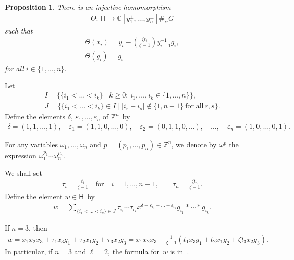\documentclass[pdftex]{sigma}
\numberwithin{equation}{section}
\newtheorem{Proposition}[Theorem]{Proposition}
{\theoremstyle{definition}
\newtheorem{Definition}[Theorem]{Definition}
\newtheorem{Example}[Theorem]{Example}
\newtheorem{Remark}[Theorem]{Remark}
\newtheorem{Notation}[Theorem]{Notation}
}
\begin{document}
\begin{Proposition}
\label{T1}
There is an injective homomorphism
\begin{gather*}
\Theta: \ \mathsf{H} \longrightarrow {\mathbb{C}}[y_1^\pm, \ldots, y_n^\pm]\#_\alpha G
\end{gather*}
such that
\begin{gather}
\Theta(x_i) = y_i - \left(\frac{\zeta t_i}{\zeta-1} \right) y_{i+1}^{-1}g_i,
\label{theta1}
\\
\Theta(g_i) = g_i
\label{theta3}
\end{gather}
for all $i\in\{1,\ldots, n\}$.
\end{Proposition}

Let
\begin{gather*}
I = \{\{i_1<\dots<i_k\} \mid k\ge 0; \ i_1,\ldots, i_k\in \{1,\dots,n\} \},
\\
J = \{\{i_1<\dots<i_k\}\in I \mid |i_r-i_s|\notin\{1,n-1\}\ \text{for all}\ r, s \}.
\end{gather*}
Def\/ine the elements $\delta$, $\varepsilon_1, \ldots, \varepsilon_n$ of ${\mathbb{Z}}^n$~by
\begin{gather*}
\delta = (1,1,\dots,1),
\quad
\varepsilon_1 = (1,1,0,\dots,0),
\quad
\varepsilon_2 = (0,1,1,0,\dots),
\quad
\ldots,
\quad
\varepsilon_n = (1,0,\dots,0,1).
\end{gather*}

\begin{Notation}
For any variables $\omega_1, \ldots, \omega_n$ and $p=(p_1,\ldots,p_n)\in {\mathbb{Z}}^n$, we denote by $\omega^p$ the
expression $\omega_1^{p_1} \cdots \omega_n^{p_n}$.
\end{Notation}

We shall set
\begin{gather*}
\tau_i = \frac{t_i}{\zeta-1}
\quad
\text{for}
\quad
i=1,\ldots, n-1,
\qquad
\tau_n = \frac{\zeta t_n}{\zeta-1}.
\end{gather*}
Def\/ine the element $w \in \mathsf{H}$~by
\begin{gather*}
w = \sum\limits_{\{i_1<\dots<i_k\}\in J} \tau_{i_1}\cdots \tau_{i_k} x^{\delta-\varepsilon_{i_1} - \dots -
\varepsilon_{i_k}} g_{i_1}*\cdots * g_{i_k}.
\end{gather*}

\begin{Example}
If $n=3$, then
\begin{gather*}
w = x_1x_2x_3 +\tau_1 x_3 g_1 + \tau_2 x_1 g_2 + \tau_3 x_2 g_3
= x_1 x_2 x_3 +\frac{1}{\zeta-1} \left(t_1 x_3 g_1 + t_2 x_1 g_2 + \zeta t_3 x_2 g_3 \right).
\end{gather*}
In particular, if $n=3$ and $\ell=2$, the formula for~$w$ is in~\cite[Lemma~7.1]{CGW}.
\end{Example}
\end{document}
